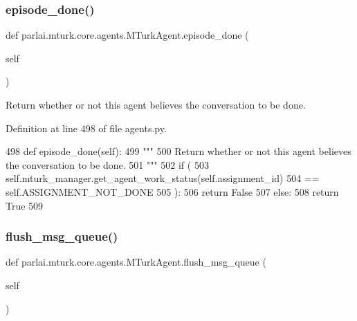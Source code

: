 \subsubsection{\texorpdfstring{episode\+\_\+done()}{episode\_done()}}
{\footnotesize\ttfamily def parlai.\+mturk.\+core.\+agents.\+M\+Turk\+Agent.\+episode\+\_\+done (\begin{DoxyParamCaption}\item[{}]{self }\end{DoxyParamCaption})}

\begin{DoxyVerb}Return whether or not this agent believes the conversation to be done.
\end{DoxyVerb}
 

Definition at line 498 of file agents.\+py.


\begin{DoxyCode}
498     \textcolor{keyword}{def }episode\_done(self):
499         \textcolor{stringliteral}{"""}
500 \textcolor{stringliteral}{        Return whether or not this agent believes the conversation to be done.}
501 \textcolor{stringliteral}{        """}
502         \textcolor{keywordflow}{if} (
503             self.mturk\_manager.get\_agent\_work\_status(self.assignment\_id)
504             == self.ASSIGNMENT\_NOT\_DONE
505         ):
506             \textcolor{keywordflow}{return} \textcolor{keyword}{False}
507         \textcolor{keywordflow}{else}:
508             \textcolor{keywordflow}{return} \textcolor{keyword}{True}
509 
\end{DoxyCode}
\mbox{\label{classparlai_1_1mturk_1_1core_1_1agents_1_1MTurkAgent_a7e522f68c78685e18b602f7579acce9d}} 
\subsubsection{\texorpdfstring{flush\+\_\+msg\+\_\+queue()}{flush\_msg\_queue()}}
{\footnotesize\ttfamily def parlai.\+mturk.\+core.\+agents.\+M\+Turk\+Agent.\+flush\+\_\+msg\+\_\+queue (\begin{DoxyParamCaption}\item[{}]{self }\end{DoxyParamCaption})}

